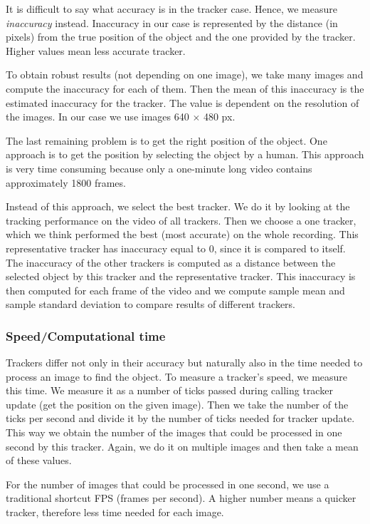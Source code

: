It is difficult to say what accuracy is in the tracker case. Hence, we
measure \emph{inaccuracy} instead. Inaccuracy in our case is represented by the
distance (in pixels) from the true position of the object and the one provided
by the tracker. Higher values mean less accurate tracker.

To obtain robust results (not depending on one image), we take many images and
compute the inaccuracy for each of them. Then the mean of this inaccuracy is
the estimated inaccuracy for the tracker. The value is dependent on the
resolution of the images. In our case we use images 640 $\times$ 480 px.

The last remaining problem is to get the right position of the object. One
approach is to get the position by selecting the object by a human. This
approach is very time consuming because only a one-minute long video contains
approximately 1800 frames.

Instead of this approach, we select the best tracker. We do it by looking at
the tracking performance on the video of all trackers. Then we choose a one
tracker, which we think performed the best (most accurate) on the whole
recording. This representative tracker has inaccuracy equal to 0, since it is
compared to itself.  The inaccuracy of the other trackers is computed as a
distance between the selected object by this tracker and the representative
tracker. This inaccuracy is then computed for each frame of the video and we
compute sample mean and sample standard deviation to compare results of
different trackers.

\subsubsection*{Speed/Computational time}

Trackers differ not only in their accuracy but naturally also in the time
needed to process an image to find the object. To measure a tracker's speed,
we measure this time. We measure it as a number of ticks passed during calling
tracker update (get the position on the given image). Then we take the number
of the ticks per second and divide it by the number of ticks needed for tracker
update. This way we obtain the number of the images that could be processed in
one second by this tracker. Again, we do it on multiple images and then take a mean
of these values.

For the number of images that could be processed in one second, we use a
traditional shortcut FPS (frames per second). A higher number means a quicker
tracker, therefore less time needed for each image.

